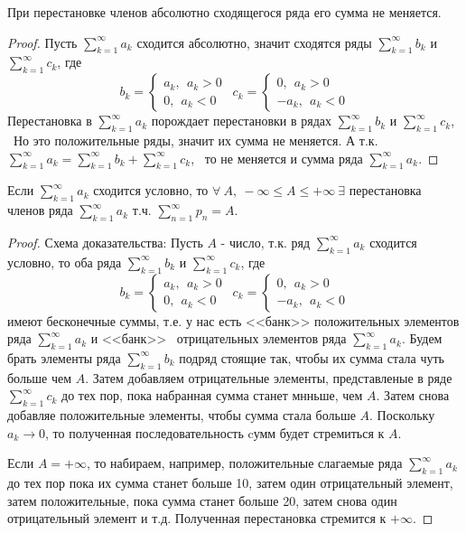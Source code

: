 \documentclass[../../main.tex]{subfiles}
\begin{document}
\begin{crl*}
	При перестановке членов абсолютно сходящегося ряда его сумма не меняется.
\end{crl*}
\begin{proof}
		Пусть $\sum\limits_{k = 1}^{\infty} a_k$ сходится абсолютно,
		значит сходятся ряды $\sum\limits_{k = 1}^{\infty} b_k$ и
		$\sum\limits_{k = 1}^{\infty} c_k$, где\[b_k = \begin{cases}
			a_k, \ \ a_k > 0\\
			0, \ \ a_k < 0
		  \end{cases} \ \
		 c_k = \begin{cases}
			0, \ \ a_k > 0\\
			-a_k, \ \ a_k < 0
		  \end{cases}\]
  Перестановка в $\sum\limits_{k = 1}^{\infty} a_k$ порождает перестановки
  в рядах  $\sum\limits_{k = 1}^{\infty} b_k$ и
  $\sum\limits_{k = 1}^{\infty} c_k$, \ Но это положительные ряды,
  значит их сумма не меняется. А т.к. $\sum\limits_{k = 1}^{\infty} a_k
   = \sum\limits_{k = 1}^{\infty} b_k + \sum\limits_{k = 1}^{\infty} c_k$,
   \ то не меняется и сумма ряда $\sum\limits_{k = 1}^{\infty} a_k$.
\end{proof}
\begin{thm}
	Если $\sum\limits_{k = 1}^{\infty} a_k$ сходится условно, то
	$\forall \ A, \ - \infty \leq A \leq + \infty \ \exists$
	перестановка членов ряда $\sum\limits_{k = 1}^{\infty} a_k$ т.ч.
	$\sum\limits_{n = 1}^{\infty} p_n = A$.
	\begin{proof}
		Схема доказательства: Пусть $A$ - число, т.к. ряд
		$\sum\limits_{k = 1}^{\infty} a_k$ сходится условно, то оба ряда
		$\sum\limits_{k = 1}^{\infty} b_k$ и
		$\sum\limits_{k = 1}^{\infty} c_k$, где
		\[b_k = \begin{cases}
			a_k, \ \ a_k > 0\\
			0, \ \ a_k < 0
		  \end{cases} \ \
		 c_k = \begin{cases}
			0, \ \ a_k > 0\\
			-a_k, \ \ a_k < 0
		  \end{cases}\]
		  имеют бесконечные суммы, т.е. у нас есть <<банк>> положительных
		  элементов	ряда $\sum\limits_{k = 1}^{\infty} a_k$ и <<банк>> \
		  отрицательных элементов ряда $\sum\limits_{k = 1}^{\infty} a_k$.
		  Будем брать элементы ряда $\sum\limits_{k = 1}^{\infty} b_k$
		  подряд стоящие так, чтобы их сумма стала чуть больше чем $A$.
		  Затем добавляем отрицательные элементы, представленые в ряде
		  $\sum\limits_{k = 1}^{\infty} c_k$ до тех пор, пока набранная
		  сумма станет мнньше, чем $A$. Затем снова добавляе положительные
		  элементы, чтобы сумма стала больше $A$. Поскольку $a_k \to 0$,
		  то полученная последовательность cумм будет стремиться к $A$.

		  Если $A = +\infty$, то набираем, например, положительные
		  слагаемые ряда $\sum\limits_{k = 1}^{\infty} a_k$ до тех пор
		  пока их сумма станет больше 10, затем один отрицательный элемент,
		  затем положительные, пока сумма станет больше 20, затем снова один
		  отрицательный элемент и т.д. Полученная перестановка стремится к
		  $+ \infty$.
	\end{proof}
\end{thm}
\end{document}
